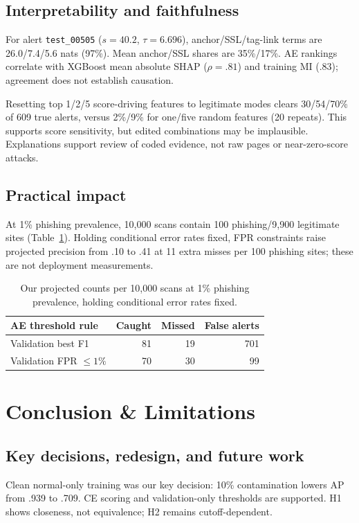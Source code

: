 \documentclass[11pt]{article}
\begin{document}
\subsection{Interpretability and faithfulness}
For alert \texttt{test\_00505} ($s=40.2$, $\tau=6.696$), anchor/SSL/tag-link terms are 26.0/7.4/5.6 nats (97\%). Mean anchor/SSL shares are 35\%/17\%. AE rankings correlate with XGBoost mean absolute SHAP \citep{lundberg2020} ($\rho=.81$) and training MI (.83); agreement does not establish causation.

Resetting top 1/2/5 score-driving features to legitimate modes clears 30/54/70\% of 609 true alerts, versus 2\%/9\% for one/five random features (20 repeats). This supports score sensitivity, but edited combinations may be implausible. Explanations support review of coded evidence, not raw pages or near-zero-score attacks.
\subsection{Practical impact}
At 1\% phishing prevalence, 10,000 scans contain 100 phishing/9,900 legitimate sites (Table~\ref{tab:ops}). Holding conditional error rates fixed, FPR constraints raise projected precision from .10 to .41 at 11 extra misses per 100 phishing sites; these are not deployment measurements.
\begin{table}[h]\centering\small
\setlength{\tabcolsep}{3pt}
\begin{tabular}{@{}lrrr@{}}\toprule
AE threshold rule & Caught & Missed & False alerts\\\midrule
Validation best F1 & 81 & 19 & 701\\
Validation FPR $\leq1\%$ & 70 & 30 & 99\\\bottomrule
\end{tabular}
\caption{Our projected counts per 10,000 scans at 1\% phishing prevalence, holding conditional error rates fixed.}\label{tab:ops}
\end{table}
\section{Conclusion \& Limitations}
\subsection{Key decisions, redesign, and future work}
Clean normal-only training was our key decision: 10\% contamination lowers AP from .939 to .709. CE scoring and validation-only thresholds are supported. H1 shows closeness, not equivalence; H2 remains cutoff-dependent.
\end{document}
